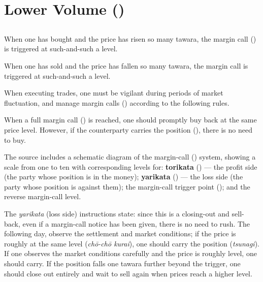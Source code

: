 \part{Lower Volume ()}

\chapter*{}
\vspace{-4\baselineskip}


\begin{sokyubox}
{\small\itshape\color{sokyubar} }

\medskip
When one has bought and the price has risen so many tawara, the margin
call () is triggered at such-and-such a level.

When one has sold and the price has fallen so many tawara, the margin
call is triggered at such-and-such a level.

When executing trades, one must be vigilant during periods of market
fluctuation, and manage margin calls () according to
the following rules.

When a full margin call () is reached, one should
promptly buy back at the same price level. However, if the counterparty
carries the position (), there is no need to buy.
\end{sokyubox}

\commentary
The source includes a schematic diagram of the margin-call
() system, showing a scale from one to ten with
corresponding levels for: \textbf{torikata} () --- the profit
side (the party whose position is in the money); \textbf{yarikata}
() --- the loss side (the party whose position is against
them); the margin-call trigger point (); and the reverse
margin-call level.

The \textit{yarikata} (loss side) instructions state: since this is a
closing-out and sell-back, even if a margin-call notice has been given,
there is no need to rush. The following day, observe the settlement and
market conditions; if the price is roughly at the same level
(\textit{ch\=o-ch\=o kurai}), one should carry the position
(\textit{tsunagi}). If one observes the market conditions carefully and the
price is roughly level, one should carry. If the position falls one
tawara further beyond the trigger, one should close out entirely and wait
to sell again when prices reach a higher level.

